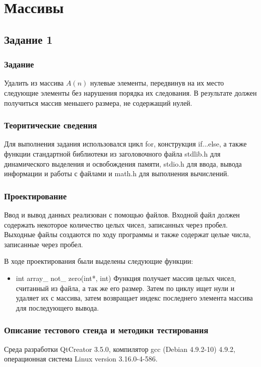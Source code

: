 \documentclass[12pt,a4paper]{report}
\begin{document}
\chapter{Массивы}
\section{Задание 1}
\subsection{Задание}

Удалить из массива $A(n)$ нулевые элементы, передвинув на их место следующие элементы без нарушения порядка их следования. В результате должен получиться массив меньшего размера, не содержащий нулей.

\subsection{Теоритические сведения}

Для выполнения задания использовался цикл for, конструкция if...else, а также функции стандартной библиотеки из заголовочного файла stdlib.h для динамического выделения и освобождения памяти, stdio.h для ввода, вывода информации и работы с файлами и math.h для выполнения вычислений.

\subsection{Проектирование}

Ввод и вывод данных реализован с помощью файлов. Входной файл должен содержать некоторое количество целых чисел, записанных через пробел. Выходные файлы создаются по ходу программы и также содержат целые числа, записанные через пробел.
 
В ходе проектирования были выделены следующие функции:

\begin{itemize}
 	
 	\item int array\_ not\_ zero(int*, int)
 	Функция получает массив целых чисел, считанный из файла, а так же его размер. Затем по циклу ищет нули и удаляет их с массива, затем возвращает индекс последнего элемента массива для последующего вывода.
 	
\end{itemize}
	
\subsection{Описание тестового стенда и методики тестирования}
Среда разработки QtCreator 3.5.0, компилятор gcc (Debian 4.9.2-10) 4.9.2, операционная система Linux version 3.16.0-4-586.
\end{document}
